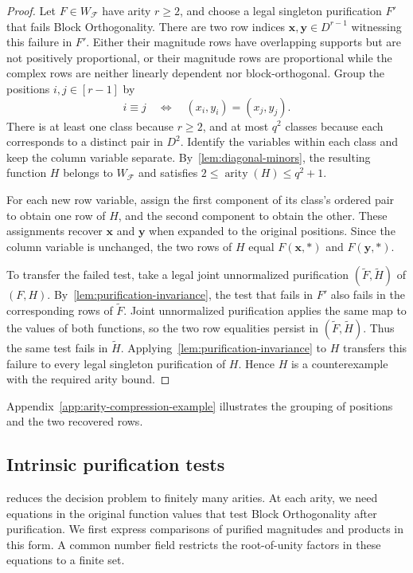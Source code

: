 \documentclass[11pt,letterpaper,onecolumn]{article}
\theoremstyle{plain}
\theoremstyle{definition}
\theoremstyle{remark}
\newcommand{\cF}{\mathcal F}
\DeclareMathOperator{\arity}{arity}
\begin{document}
\begin{proof}
Let $F\in W_{\cF}$ have arity $r\ge2$, and choose a legal singleton
purification $F'$ that fails Block Orthogonality.
There are two row indices $\mathbf x,\mathbf y\in D^{r-1}$ witnessing
this failure in $F'$.
Either their magnitude rows have overlapping supports but are not
positively proportional, or their magnitude rows are proportional
while the complex rows are neither linearly dependent nor
block-orthogonal.
Group the positions $i,j\in[r-1]$ by
\[
  i\equiv j
  \quad\Longleftrightarrow\quad
  (x_i,y_i)=(x_j,y_j).
\]
There is at least one class because $r\ge2$, and at most $q^2$ classes
because each corresponds to a distinct pair in $D^2$.
Identify the variables within each class and keep the column variable
separate.  By~\cref{lem:diagonal-minors}, the resulting function $H$
belongs to $W_{\cF}$ and satisfies $2\le\arity(H)\le q^2+1$.

For each new row variable, assign the first component of its class's
ordered pair to obtain one row of $H$, and the second component to
obtain the other.
These assignments recover $\mathbf x$ and $\mathbf y$ when expanded
to the original positions.  Since the column variable is unchanged,
the two rows of $H$ equal $F(\mathbf x,\ast)$ and $F(\mathbf y,\ast)$.

To transfer the failed test, take a legal joint unnormalized
purification $(\widetilde F,\widetilde H)$ of $(F,H)$.
By~\cref{lem:purification-invariance}, the test that fails in $F'$ also
fails in the corresponding rows of $\widetilde F$.
Joint unnormalized purification applies the same map to the values of
both functions, so the two row equalities persist in
$(\widetilde F,\widetilde H)$.
Thus the same test fails in $\widetilde H$.
Applying~\cref{lem:purification-invariance} to $H$ transfers this failure
to every legal singleton purification of $H$.
Hence $H$ is a counterexample with the required arity bound.
\end{proof}

Appendix~\ref{app:arity-compression-example} illustrates the grouping of
positions and the two recovered rows.

\subsection{Intrinsic purification tests}
\label{subsec:intrinsic-purification-tests}

 reduces the decision problem to finitely many
arities.  At each arity, we need equations in the original function values
that test Block Orthogonality after purification.  We first express
comparisons of purified magnitudes and products in this form.  A common
number field restricts the root-of-unity factors in these equations to a
finite set.
\end{document}
